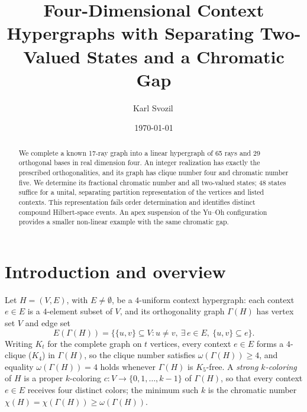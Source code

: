 \documentclass[
  aps,
  pra,
  reprint,
  superscriptaddress,
  amsmath,
  amssymb,
  nofootinbib,
  floatfix
]{revtex4-2}
\theoremstyle{definition}
\theoremstyle{remark}
\begin{document}
\title{Four-Dimensional Context Hypergraphs with Separating Two-Valued States and a Chromatic Gap}

\author{Karl Svozil\,}


\date{\today}

\begin{abstract}
We complete a known 17-ray graph into a linear hypergraph of 65 rays and 29 orthogonal bases in real dimension four. An integer realization has exactly the prescribed orthogonalities, and its graph has clique number four and chromatic number five. We determine its fractional chromatic number and all two-valued states; 48 states suffice for a unital, separating partition representation of the vertices and listed contexts. This representation fails order determination and identifies distinct compound Hilbert-space events. An apex suspension of the Yu--Oh configuration provides a smaller non-linear example with the same chromatic gap.
\end{abstract}

\maketitle

\section{Introduction and overview}

Let $H=(V,E)$, with $E\ne\emptyset$, be a $4$-uniform context hypergraph: each context $e\in E$ is a $4$-element subset of $V$, and its orthogonality graph $\Gamma(H)$ has vertex set $V$ and edge set
\begin{equation}\label{eq:orth-graph}
E(\Gamma(H))=\bigl\{\{u,v\}\subseteq V : u\ne v,\ \exists\,e\in E,\ \{u,v\}\subseteq e\bigr\}.
\end{equation}
Writing $K_t$ for the complete graph on $t$ vertices, every context $e\in E$ forms a $4$-clique ($K_4$) in $\Gamma(H)$, so the clique number satisfies $\omega(\Gamma(H))\ge 4$, and equality $\omega(\Gamma(H))=4$ holds whenever $\Gamma(H)$ is $K_5$-free. A \emph{strong $k$-coloring} of $H$ is a proper $k$-coloring $c:V\to\{0,1,\ldots,k-1\}$ of $\Gamma(H)$, so that every context $e\in E$ receives four distinct colors; the minimum such $k$ is the chromatic number $\chi(H)=\chi(\Gamma(H))\ge\omega(\Gamma(H))$.
\end{document}
